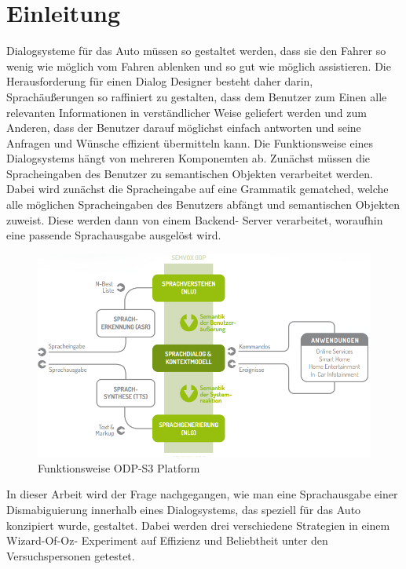 \documentclass[12pt,a4paper]{scrartcl}
\begin{document}
\section{Einleitung}

Dialogsysteme für das Auto müssen so gestaltet werden, dass sie den Fahrer so wenig wie möglich vom Fahren ablenken und so gut wie möglich assistieren. Die Herausforderung für einen Dialog Designer besteht daher darin, Sprachäußerungen so raffiniert zu gestalten, dass dem Benutzer zum Einen alle relevanten Informationen in verständlicher Weise geliefert werden und zum Anderen, dass der Benutzer darauf möglichst einfach antworten und seine Anfragen und Wünsche effizient übermitteln kann. Die Funktionsweise eines Dialogsystems hängt von mehreren Komponemten ab. Zunächst müssen die Spracheingaben des Benutzer zu semantischen Objekten verarbeitet werden. Dabei wird zunächst die Spracheingabe auf eine Grammatik gematched, welche alle möglichen Spracheingaben des Benutzers abfängt und semantischen Objekten zuweist. Diese werden dann von einem Backend- Server verarbeitet, woraufhin eine passende Sprachausgabe ausgelöst wird. 
\begin{figure}[htbp]
\begin{center}
\includegraphics[width=12cm]{odps3.png}
\caption{Funktionsweise ODP-S3 Platform}
\label{odps3}
\end{center}
\end{figure}
In dieser Arbeit wird der Frage nachgegangen, wie man eine Sprachausgabe einer Dismabiguierung innerhalb eines Dialogsystems, das speziell für das Auto konzipiert wurde, gestaltet. Dabei werden drei verschiedene Strategien in einem Wizard-Of-Oz- Experiment auf Effizienz und Beliebtheit unter den Versuchspersonen getestet.
\end{document}
